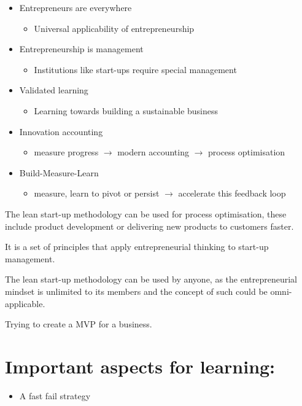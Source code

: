 \documentclass{article}
\begin{document}
\begin{itemize}

\item Entrepreneurs are everywhere
  \begin{itemize}
  \item Universal applicability of entrepreneurship  
  \end{itemize}
\item Entrepreneurship is management
  \begin{itemize}
  \item Institutions like start-ups require special management
  \end{itemize}
\item Validated learning
  \begin{itemize}
  \item Learning towards building a sustainable business
  \end{itemize}
\item Innovation accounting
  \begin{itemize}
  \item measure progress $\rightarrow$ modern accounting $\rightarrow$ process optimisation
  \end{itemize}
\item Build-Measure-Learn
  \begin{itemize}
  \item measure, learn to pivot or persist $\rightarrow$ accelerate this feedback loop
  \end{itemize}

\end{itemize}

The lean start-up methodology can be used for process optimisation, these include product development or delivering new products to customers faster.\par
It is a set of principles that apply entrepreneurial thinking to start-up management.


The lean start-up methodology can be used by anyone, as the entrepreneurial mindset is unlimited to its members and the concept of such could be omni-applicable. 


Trying to create a MVP for a business. 


\section{Important aspects for learning:}


\begin{itemize}
  \item A fast fail strategy
\end{itemize}
\end{document}
